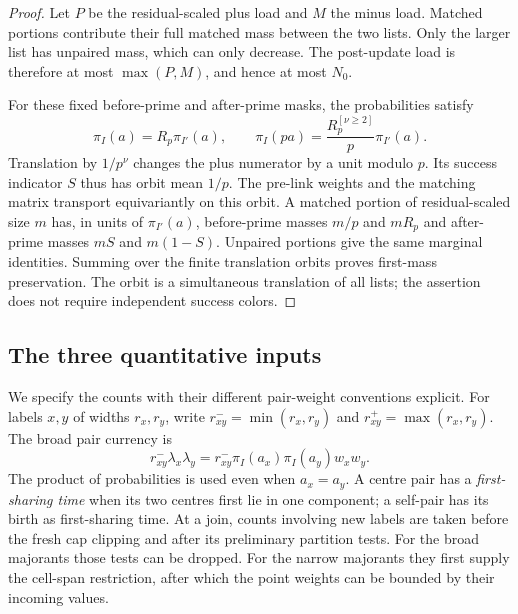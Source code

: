 \begin{proof}
Let $P$ be the residual-scaled plus load and $M$ the minus load.
Matched portions contribute their full matched mass between the two
lists.  Only the larger list has unpaired mass, which can only
decrease.  The post-update load is therefore at most $\max(P,M)$,
and hence at most $N_0$.

For these fixed before-prime and after-prime masks, the probabilities
satisfy
\begin{equation}
 \pi_I(a)=R_p\pi_{I'}(a),\qquad
 \pi_I(pa)=\frac{R_p^{[\nu\ge2]}}p\pi_{I'}(a).
 \label{tab:mask-transition}
\end{equation}
Translation by $1/p^\nu$ changes the plus numerator by a unit
modulo $p$.  Its success indicator $S$ thus has orbit mean $1/p$.
The pre-link weights and the matching matrix transport equivariantly
on this orbit.  A matched portion of residual-scaled size $m$ has,
in units of $\pi_{I'}(a)$, before-prime masses $m/p$ and $mR_p$ and
after-prime masses $mS$ and $m(1-S)$.  Unpaired portions give the
same marginal identities.  Summing over the finite translation
orbits proves first-mass preservation.  The orbit is a simultaneous
translation of all lists; the assertion does not require independent
success colors.
\end{proof}

\subsection{The three quantitative inputs}

We specify the counts with their different pair-weight conventions
explicit.  For labels $x,y$ of widths $r_x,r_y$, write
$r_{xy}^- =\min(r_x,r_y)$ and $r_{xy}^+=\max(r_x,r_y)$.
The broad pair currency is
\begin{equation}
 r_{xy}^-\lambda_x\lambda_y
 =r_{xy}^-\pi_I(a_x)\pi_I(a_y)w_xw_y.
 \label{tab:product-law}
\end{equation}
The product of probabilities is used even when $a_x=a_y$.  A centre
pair has a \emph{first-sharing time} when its two centres first lie
in one component; a self-pair has its birth as first-sharing time.
At a join, counts involving new labels are taken before the fresh
cap clipping and after its preliminary partition tests.  For the
broad majorants those tests can be dropped.  For the narrow
majorants they first supply the cell-span restriction, after
which the point weights can be bounded by their incoming values.

